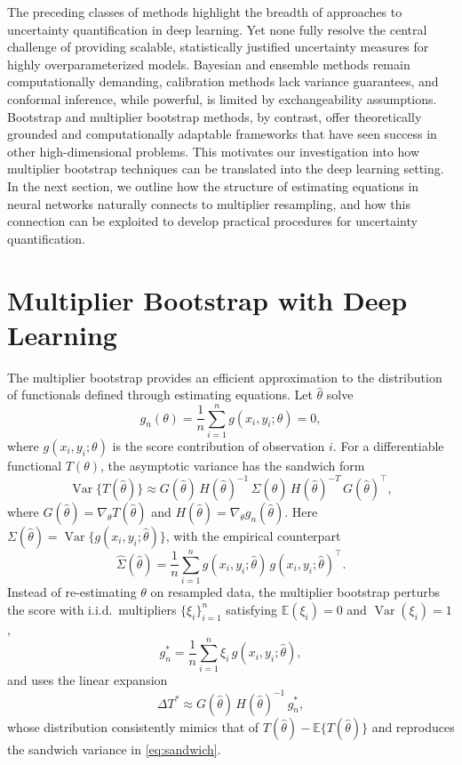 \documentclass[12pt, titlepage, reqno]{article}
\begin{document}
The preceding classes of methods highlight the breadth of approaches
to uncertainty quantification in deep learning. Yet none fully resolve
the central challenge of providing scalable, statistically justified
uncertainty measures for highly overparameterized models. Bayesian and
ensemble methods remain computationally demanding, calibration methods
lack variance guarantees, and conformal inference, while powerful, is
limited by exchangeability assumptions. Bootstrap and multiplier
bootstrap methods, by contrast, offer theoretically grounded and
computationally adaptable frameworks that have seen success in other
high-dimensional problems. This motivates our investigation into how
multiplier bootstrap techniques can be translated into the deep
learning setting. In the next section, we outline how the structure of
estimating equations in neural networks naturally connects to
multiplier resampling, and how this connection can be exploited to
develop practical procedures for uncertainty quantification.


\section{Multiplier Bootstrap with Deep Learning}

The multiplier bootstrap provides an efficient approximation to the
distribution of functionals defined through estimating equations. Let
$\hat{\theta}$ solve
\begin{equation}
g_n(\theta)=\frac{1}{n}\sum_{i=1}^n g(x_i,y_i;\theta)=0,
\label{eq:estimating}
\end{equation}
where $g(x_i,y_i;\theta)$ is the score contribution of observation $i$.
For a differentiable functional $T(\theta)$, the asymptotic variance
has the sandwich form
\begin{equation}
\operatorname{Var}\{T(\hat{\theta})\}\approx
G(\hat{\theta})\,H(\hat{\theta})^{-1}\,
\Sigma(\hat{\theta})\,H(\hat{\theta})^{-T}\,G(\hat{\theta})^\top,
\label{eq:sandwich}
\end{equation}
where $G(\hat{\theta})=\nabla_\theta T(\hat{\theta})$ and
$H(\hat{\theta})=\nabla_\theta g_n(\hat{\theta})$. Here
$\Sigma(\hat{\theta})=\operatorname{Var}\{g(x_i,y_i;\hat{\theta})\}$,
with the empirical counterpart
\begin{equation}
\widehat{\Sigma}(\hat{\theta})=
\frac{1}{n}\sum_{i=1}^n g(x_i,y_i;\hat{\theta})
\,g(x_i,y_i;\hat{\theta})^\top.
\label{eq:Sigmahat}
\end{equation}
Instead of re-estimating $\theta$ on resampled data, the multiplier
bootstrap perturbs the score with i.i.d.\ multipliers
$\{\xi_i\}_{i=1}^n$ satisfying $\mathbb{E}(\xi_i)=0$ and
$\operatorname{Var}(\xi_i)=1$,
\begin{equation}
g_n^*=\frac{1}{n}\sum_{i=1}^n \xi_i\,g(x_i,y_i;\hat{\theta}),
\label{eq:multiplier}
\end{equation}
and uses the linear expansion
\begin{equation}
\Delta T^*\approx G(\hat{\theta})\,H(\hat{\theta})^{-1}\,g_n^*,
\label{eq:linear}
\end{equation}
whose distribution consistently mimics that of
$T(\hat{\theta})-\mathbb{E}\{T(\hat{\theta})\}$ and reproduces the
sandwich variance in \eqref{eq:sandwich}.
\end{document}
